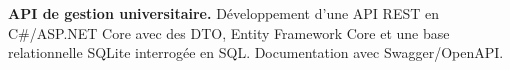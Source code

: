 
\begin{cvparagraph}
\noindent\textbf{API de gestion universitaire.} Développement d’une API REST en C\#/ASP.NET Core avec des DTO, Entity Framework Core et une base relationnelle SQLite interrogée en SQL. Documentation avec Swagger/OpenAPI.
\end{cvparagraph}
